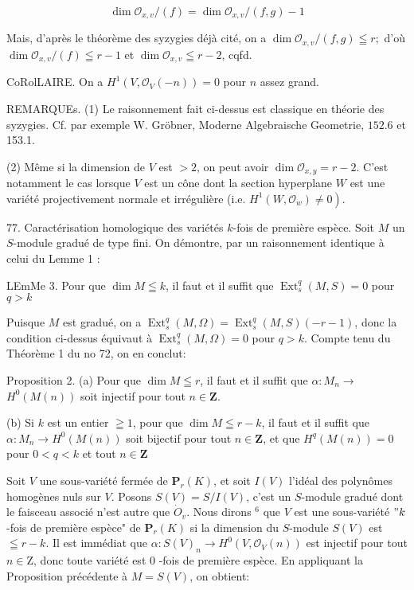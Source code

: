 $$
\operatorname{dim} \mathcal{O}_{x, v} /(f)=\operatorname{dim} \mathcal{O}_{x, v} /(f, g)-1
$$

Mais, d'après le théorème des syzygies déjà cité, on a $\operatorname{dim} \mathcal{O}_{x, v} /(f, g) \leqq r ;$ d'où $\operatorname{dim} \mathcal{O}_{x, v} /(f) \leqq r-1$ et $\operatorname{dim} \mathcal{O}_{x, v} \leqq r-2$, cqfd.

CoRolLAIRE. On a $H^{1}\left(V, \mathcal{O}_{V}(-n)\right)=0$ pour $n$ assez grand.

REMARQUEs. (1) Le raisonnement fait ci-dessus est classique en théorie des syzygies. Cf. par exemple W. Gröbner, Moderne Algebraische Geometrie, $152.6$ et 153.1.

(2) Même si la dimension de $V$ est $>2$, on peut avoir $\operatorname{dim} \mathcal{O}_{x, y}=r-2$. C'est notamment le cas lorsque $V$ est un cône dont la section hyperplane $W$ est une variété projectivement normale et irrégulière (i.e. $\left.H^{1}\left(W, \mathcal{O}_{w}\right) \neq 0\right)$.

77. Caractérisation homologique des variétés $k$-fois de première espèce. Soit $M$ un $S$-module gradué de type fini. On démontre, par un raisonnement identique à celui du Lemme 1 :

LEmMe 3. Pour que $\operatorname{dim} M \leqq k$, il faut et il suffit que $\operatorname{Ext}_{s}^{q}(M, S)=0$ pour $q>k$

Puisque $M$ est gradué, on a $\operatorname{Ext}_{s}^{q}(M, \Omega)=\operatorname{Ext}_{s}^{q}(M, S)(-r-1)$, donc la condition ci-dessus équivaut à $\operatorname{Ext}_{s}^{q}(M, \Omega)=0$ pour $q>k$. Compte tenu du Théorème 1 du no 72, on en conclut:

Proposition 2. (a) Pour que $\operatorname{dim} M \leqq r$, il faut et il suffit que $\alpha: M_{n} \rightarrow$ $H^{0}(M(n))$ soit injectif pour tout $n \in \mathbf{Z}$.

(b) Si $k$ est un entier $\geqq 1$, pour que $\operatorname{dim} M \leqq r-k$, il faut et il suffit que $\alpha: M_{n} \rightarrow H^{0}(M(n))$ soit bijectif pour tout $n \in \mathbf{Z}$, et que $H^{q}(M(n))=0$ pour $0<q<k$ et tout $n \in \mathbf{Z}$

Soit $V$ une sous-variété fermée de $\mathbf{P}_{r}(K)$, et soit $I(V)$ l'idéal des polynômes homogènes nuls sur $V$. Posons $S(V)=S / I(V)$, c'est un $S$-module gradué dont le faisceau associé n'est autre que $\dot{O}_{v} .$ Nous dirons $^{6}$ que $V$ est une sous-variété $" k$-fois de première espèce" de $\mathbf{P}_{r}(K)$ si la dimension du $S$-module $S(V)$ est $\leqq r-k$. Il est immédiat que $\alpha: S(V)_{n} \rightarrow H^{0}\left(V, \mathcal{O}_{V}(n)\right)$ est injectif pour tout $n \in \mathrm{Z}$, donc toute variété est 0 -fois de première espèce. En appliquant la Proposition précédente à $M=S(V)$, on obtient:

